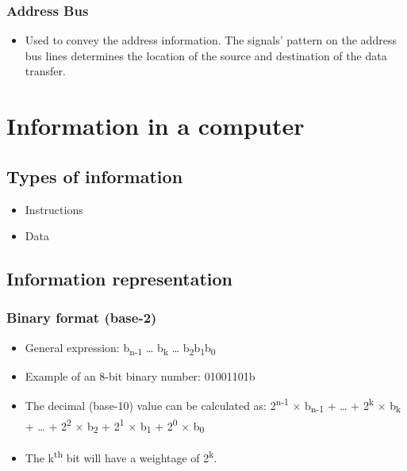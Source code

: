 \documentclass[11pt]{article}
\begin{document}
\subsubsection{Address Bus}
\label{sec:org3d9f86e}
\begin{itemize}
\item Used to convey the address information. The signals' pattern on the address bus lines determines the location of the source and destination of the data transfer.
\end{itemize}
\section{Information in a computer}
\label{sec:org08e84a8}

\subsection{Types of information}
\label{sec:orgc304bd4}
\begin{itemize}
\item Instructions
\item Data
\end{itemize}

 \newpage
\subsection{Information representation}
\label{sec:orgfde5db4}

\subsubsection{Binary format (base-2)}
\label{sec:org87defa3}
\begin{itemize}
\item General expression: b\textsubscript{n-1} \ldots{} b\textsubscript{k} \ldots{} b\textsubscript{2}b\textsubscript{1}b\textsubscript{0}
\item Example of an 8-bit binary number: 01001101b
\item The decimal (base-10) value can be calculated as:
2\textsuperscript{n-1} × b\textsubscript{n-1} + \ldots{} + 2\textsuperscript{k} × b\textsubscript{k} + \ldots{} + 2\textsuperscript{2} × b\textsubscript{2} + 2\textsuperscript{1} × b\textsubscript{1} + 2\textsuperscript{0} × b\textsubscript{0}

\item The k\textsuperscript{th} bit will have a weightage of 2\textsuperscript{k}.
\end{itemize}
\end{document}
